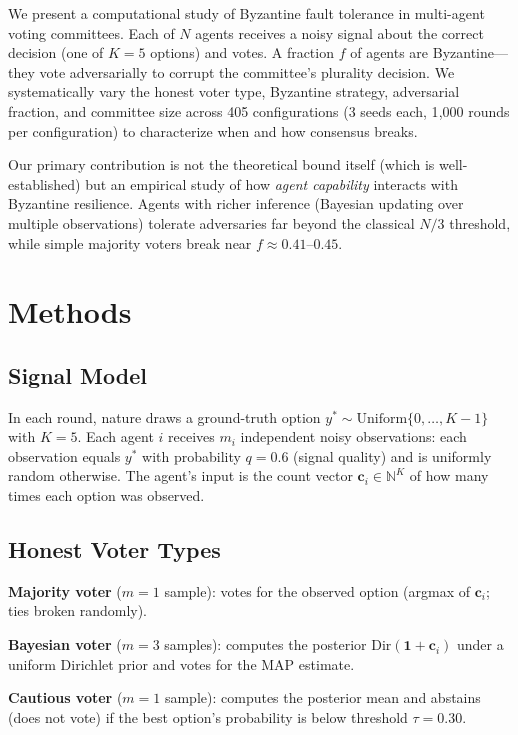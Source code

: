 \documentclass[11pt]{article}
\begin{document}
We present a computational study of Byzantine fault tolerance in multi-agent voting committees.
Each of $N$ agents receives a noisy signal about the correct decision (one of $K=5$ options) and votes.
A fraction $f$ of agents are Byzantine---they vote adversarially to corrupt the committee's plurality decision.
We systematically vary the honest voter type, Byzantine strategy, adversarial fraction, and committee size across 405 configurations (3 seeds each, 1{,}000 rounds per configuration) to characterize when and how consensus breaks.

Our primary contribution is not the theoretical bound itself (which is well-established) but an empirical study of how \emph{agent capability} interacts with Byzantine resilience.
Agents with richer inference (Bayesian updating over multiple observations) tolerate adversaries far beyond the classical $N/3$ threshold, while simple majority voters break near $f \approx 0.41$--$0.45$.

\section{Methods}

\subsection{Signal Model}

In each round, nature draws a ground-truth option $y^* \sim \mathrm{Uniform}\{0, \ldots, K{-}1\}$ with $K = 5$.
Each agent $i$ receives $m_i$ independent noisy observations: each observation equals $y^*$ with probability $q = 0.6$ (signal quality) and is uniformly random otherwise.
The agent's input is the count vector $\mathbf{c}_i \in \mathbb{N}^K$ of how many times each option was observed.

\subsection{Honest Voter Types}

\textbf{Majority voter} ($m = 1$ sample): votes for the observed option (argmax of $\mathbf{c}_i$; ties broken randomly).

\textbf{Bayesian voter} ($m = 3$ samples): computes the posterior $\mathrm{Dir}(\mathbf{1} + \mathbf{c}_i)$ under a uniform Dirichlet prior and votes for the MAP estimate.

\textbf{Cautious voter} ($m = 1$ sample): computes the posterior mean and abstains (does not vote) if the best option's probability is below threshold $\tau = 0.30$.
\end{document}
